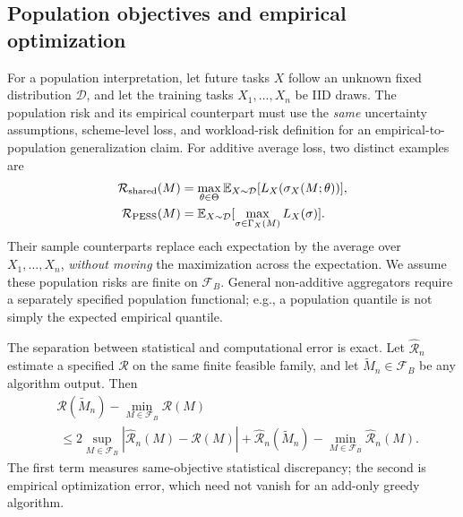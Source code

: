 \documentclass[sigconf, nonacm]{acmart}
\begin{document}
\subsection{Population objectives and empirical optimization}
\label{sec:population}
For a population interpretation, let future tasks $X$ follow
an unknown fixed distribution $\mathcal D$, and let the
training tasks $X_1,\dots,X_n$ be IID draws. The population
risk and its empirical counterpart must use the \emph{same}
uncertainty assumptions, scheme-level loss, and workload-risk
definition for an empirical-to-population generalization claim.
For additive average loss, two distinct examples are
\begin{align}
\mathcal R_{\rm shared}(M)
 &=\max_{\theta\in\Theta}
 \mathbb E_{X\sim\mathcal D}
 [L_X(\sigma_X(M;\theta))],\label{eq:pop-shared}\\
\mathcal R_{\rm PESS}(M)
 &=\mathbb E_{X\sim\mathcal D}
 [\max_{\sigma\in\Gamma_X(M)}L_X(\sigma)].
 \label{eq:pop-pess}
\end{align}
Their sample counterparts replace each expectation by
the average over $X_1,\dots,X_n$, \emph{without moving}
the maximization across the expectation. We assume these
population risks are finite on $\mathcal F_B$. General
non-additive aggregators require a separately specified
population functional; e.g., a population quantile is not
simply the expected empirical quantile.

The separation between statistical and computational error
is exact. Let $\widehat{\mathcal R}_n$ estimate a specified
$\mathcal R$ on the same finite feasible family, and let
$\widetilde M_n\in\mathcal F_B$ be any algorithm output.
Then
\begin{align}
\label{eq:excess-decomposition}
&\mathcal R(\widetilde M_n)-\min_{M\in\mathcal F_B}
\mathcal R(M)\nonumber\\
&\ \leq
2\sup_{M\in\mathcal F_B}
|\widehat{\mathcal R}_n(M)-\mathcal R(M)|
+\widehat{\mathcal R}_n(\widetilde M_n)
-\min_{M\in\mathcal F_B}\widehat{\mathcal R}_n(M).
\end{align}
The first term measures same-objective statistical discrepancy;
the second is empirical optimization error, which need not
vanish for an add-only greedy algorithm.
\end{document}
